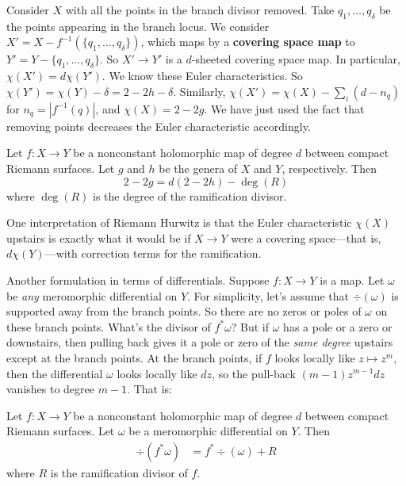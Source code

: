 \documentclass[12pt]{article}
\begin{document}
Consider $X$ with all the points in the branch divisor removed. Take $q_1, \ldots, q_\delta$ be the points appearing in the branch locus. We consider $X' = X - f^{-1}(\{q_1, \ldots, q_\delta\})$, which maps by a \textbf{covering space map} to $Y' = Y - \{q_1, \ldots, q_\delta\}$. So $X' \to Y'$ is a $d$-sheeted covering space map. In particular, $\chi(X') = d\chi(Y')$. We know these Euler characteristics. So $\chi(Y') = \chi(Y) - \delta = 2 - 2h - \delta$. Similarly, $\chi(X') = \chi(X) - \sum_i (d - n_q)$ for $n_q = |f^{-1}(q)|$, and $\chi(X) = 2 - 2g$. We have just used the fact that removing points decreases the Euler characteristic accordingly.
\begin{theorem}
    Let $f : X \to Y$ be a nonconstant holomorphic map of degree $d$ between compact Riemann surfaces. Let $g$ and $h$ be the genera of $X$ and $Y$, respectively. Then
    $$2 - 2g = d(2 - 2h) - \deg(R)$$
    where $\deg(R)$ is the degree of the ramification divisor.
\end{theorem}

\begin{remark}
    One interpretation of Riemann Hurwitz is that the Euler characteristic $\chi(X)$ upstairs is exactly what it would be if $X \to Y$ were a covering space—that is, $d\chi(Y)$—with correction terms for the ramification. 
\end{remark}

Another formulation in terms of differentials. Suppose $f : X \to Y$ is a map. Let $\omega$ be \textit{any} meromorphic differential on $Y$. For simplicity, let's assume that $\div(\omega)$ is supported away from the branch points. So there are no zeros or poles of $\omega$ on these branch points. What's the divisor of $f^*\omega$? But if $\omega$ has a pole or a zero or downstairs, then pulling back gives it a pole or zero of the \textit{same degree} upstairs except at the branch points. At the branch points, if $f$ looks locally like $z \mapsto z^m$, then the differential $\omega$ looks locally like $dz$, so the pull-back $(m - 1)z^{m-1}dz$ vanishes to degree $m - 1$. That is:

\begin{theorem}
     Let $f : X \to Y$ be a nonconstant holomorphic map of degree $d$ between compact Riemann surfaces. Let $\omega$ be a meromorphic differential on $Y$. Then
\begin{align*}
    \div(f^*\omega) &= f^*\div(\omega) + R
\end{align*} 
where $R$ is the ramification divisor of $f$.
\end{theorem}
\end{document}
